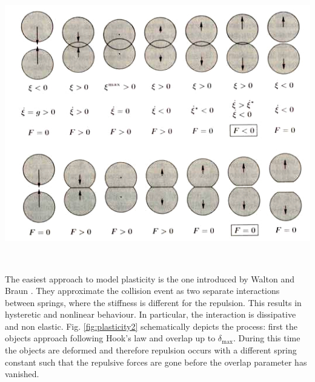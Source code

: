 \vspace{0.1cm}
\noindent
\begin{minipage}{.95\textwidth}
  \begin{minipage}{\textwidth}
    \centering
    \includegraphics[width=.85\textwidth]{pics/plasticity1.jpeg}
    \label{fig:plasticity1}
  \end{minipage}
\hfill
  \begin{minipage}{0.05\textwidth}
\,
  \end{minipage}
\end{minipage}
\vspace{0.1cm}




The easiest approach to model plasticity is the one introduced by Walton and Braun \citep{walton}. They approximate the collision event as two separate interactions between springs, where the stiffness is different for the repulsion. This results in hysteretic and nonlinear behaviour. In particular, the interaction is dissipative and non elastic. Fig. \ref{fig:plasticity2} schematically depicts the process: first the objects approach following Hook's law and overlap up to $\delta_\text{max}$. During this time the objects are deformed and therefore repulsion occurs with a different spring constant such that the repulsive forces are gone before the overlap parameter has vanished.

 



